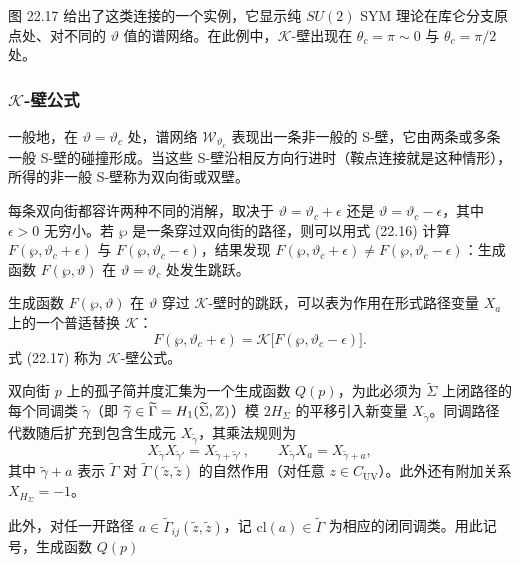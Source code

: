 图 22.17 给出了这类连接的一个实例，它显示纯 $SU(2)$ SYM 理论在库仑分支原点处、对不同的 $\vartheta$ 值的谱网络。在此例中，$\mathcal{K}$-壁出现在 $\theta_c=\pi\sim0$ 与 $\theta_c=\pi/2$ 处。

\subsubsection*{$\mathcal{K}$-壁公式}

一般地，在 $\vartheta=\vartheta_c$ 处，谱网络 $\mathcal{W}_{\vartheta_c}$ 表现出一条非一般的 S-壁，它由两条或多条一般 S-壁的碰撞形成。当这些 S-壁沿相反方向行进时（鞍点连接就是这种情形），所得的非一般 S-壁称为双向街或双壁。


每条双向街都容许两种不同的消解，取决于 $\vartheta=\vartheta_c+\epsilon$ 还是 $\vartheta=\vartheta_c-\epsilon$，其中 $\epsilon>0$ 无穷小。若 $\wp$ 是一条穿过双向街的路径，则可以用式 (22.16) 计算 $F(\wp,\vartheta_c+\epsilon)$ 与 $F(\wp,\vartheta_c-\epsilon)$，结果发现 $F(\wp,\vartheta_c+\epsilon)\ne F(\wp,\vartheta_c-\epsilon)$：生成函数 $F(\wp,\vartheta)$ 在 $\vartheta=\vartheta_c$ 处发生跳跃。

生成函数 $F(\wp,\vartheta)$ 在 $\vartheta$ 穿过 $\mathcal{K}$-壁时的跳跃，可以表为作用在形式路径变量 $X_a$ 上的一个普适替换 $\mathcal{K}$：
\begin{equation}
F(\wp,\vartheta_c+\epsilon)=\mathcal{K}\big[F(\wp,\vartheta_c-\epsilon)\big].\tag{22.17}
\end{equation}
式 (22.17) 称为 $\mathcal{K}$-壁公式。

双向街 $p$ 上的孤子简并度汇集为一个生成函数 $Q(p)$，为此必须为 $\widetilde{\Sigma}$ 上闭路径的每个同调类 $\widetilde{\gamma}$（即 $\widetilde{\gamma}\in\widetilde{\Gamma}=H_1(\widetilde{\Sigma},\mathbb{Z})$）模 $2H_\Sigma$ 的平移引入新变量 $X_{\widetilde{\gamma}}$。同调路径代数随后扩充到包含生成元 $X_{\widetilde{\gamma}}$，其乘法规则为
\[
X_{\widetilde{\gamma}}X_{\widetilde{\gamma}'}=X_{\widetilde{\gamma}+\widetilde{\gamma}'}\,,\qquad X_{\widetilde{\gamma}}X_a=X_{\widetilde{\gamma}+a},
\]
其中 $\widetilde{\gamma}+a$ 表示 $\widetilde{\Gamma}$ 对 $\widetilde{\Gamma}(\widetilde{z},\widetilde{z})$ 的自然作用（对任意 $z\in C_{\mathrm{UV}}$）。此外还有附加关系 $X_{H_\Sigma}=-1$。

此外，对任一开路径 $a\in\widetilde{\Gamma}_{ij}(\widetilde{z},\widetilde{z})$，记 $\mathrm{cl}(a)\in\widetilde{\Gamma}$ 为相应的闭同调类。用此记号，生成函数 $Q(p)$

